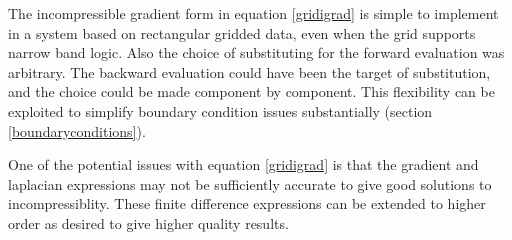 \documentclass{article}
\begin{document}
The incompressible gradient form in equation \ref{gridigrad} is simple to implement in a system based on rectangular gridded data, even when the grid supports narrow band logic.  Also the choice of substituting for the forward evaluation was arbitrary.  The backward evaluation could have been the target of substitution, and the choice could be made component by component.  This flexibility can be exploited to simplify boundary condition issues substantially (section \ref{boundaryconditions}).  

One of the potential issues with equation \ref{gridigrad} is that the gradient and laplacian expressions may not be sufficiently accurate to give good solutions to incompressiblity.  These finite difference expressions can be extended to higher order as desired to give higher quality results.  
\end{document}
